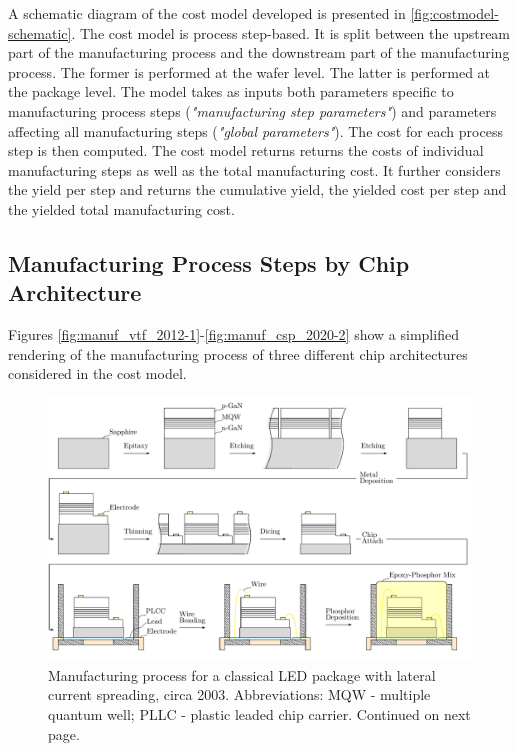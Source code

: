 \documentclass[10pt]{article}
\begin{document}
A schematic diagram of the cost model developed is presented in  \cref{fig:costmodel-schematic}. The cost model is process step-based. It is split between the upstream part of the manufacturing process and the downstream part of the manufacturing process. The former is performed at the wafer level. The latter is performed at the package level. The model takes as inputs both parameters specific to manufacturing process steps (\textit{"manufacturing step parameters"}) and parameters affecting all manufacturing steps (\textit{"global parameters"}). The cost for each process step is then computed. The cost model returns returns the costs of individual manufacturing steps as well as the total manufacturing cost. It further considers the yield per step and returns the cumulative yield, the yielded cost per step and the yielded total manufacturing cost.

\subsection{Manufacturing Process Steps by Chip Architecture}

Figures \cref{fig:manuf_vtf_2012-1}-\cref{fig:manuf_csp_2020-2} show a simplified rendering of the manufacturing process of three different chip architectures considered in the cost model.


    \begin{landscape}
        \begin{figure}
            \includegraphics[width=555pt]{./figures/classical_overview_2003.pdf}
            \caption{Manufacturing process for a classical LED package with lateral current spreading, circa 2003. Abbreviations: MQW - multiple quantum well; PLLC - plastic leaded chip carrier. Continued on next page.}
            \label{fig:manuf_classical_2003}
        \end{figure}
    \end{landscape}
    
\end{document}
